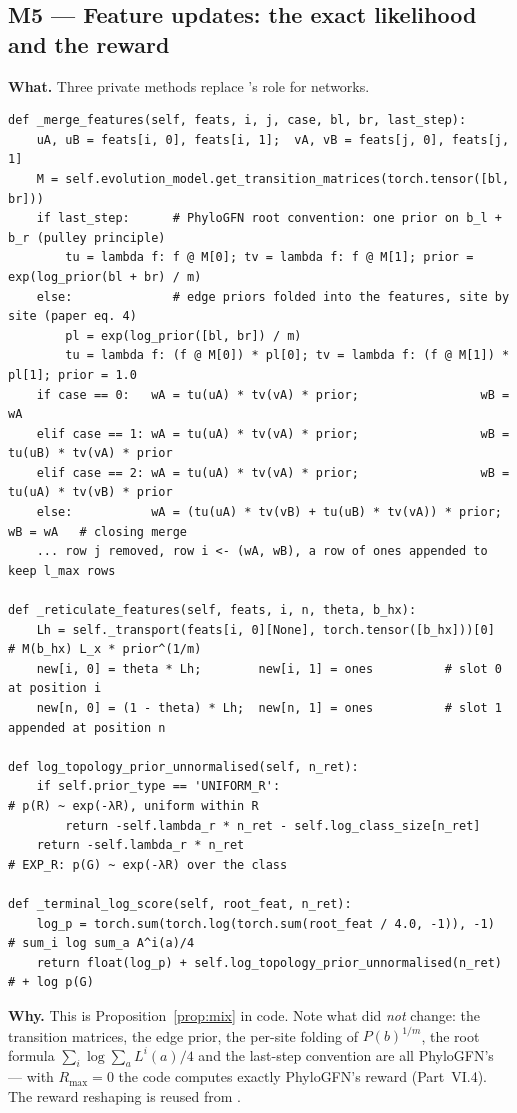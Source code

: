 \subsection{M5 --- Feature updates: the exact likelihood and the reward}
\textbf{What.} Three private methods replace 's role for networks.
\begin{lstlisting}
def _merge_features(self, feats, i, j, case, bl, br, last_step):
    uA, uB = feats[i, 0], feats[i, 1];  vA, vB = feats[j, 0], feats[j, 1]
    M = self.evolution_model.get_transition_matrices(torch.tensor([bl, br]))
    if last_step:      # PhyloGFN root convention: one prior on b_l + b_r (pulley principle)
        tu = lambda f: f @ M[0]; tv = lambda f: f @ M[1]; prior = exp(log_prior(bl + br) / m)
    else:              # edge priors folded into the features, site by site (paper eq. 4)
        pl = exp(log_prior([bl, br]) / m)
        tu = lambda f: (f @ M[0]) * pl[0]; tv = lambda f: (f @ M[1]) * pl[1]; prior = 1.0
    if case == 0:   wA = tu(uA) * tv(vA) * prior;                 wB = wA
    elif case == 1: wA = tu(uA) * tv(vA) * prior;                 wB = tu(uB) * tv(vA) * prior
    elif case == 2: wA = tu(uA) * tv(vA) * prior;                 wB = tu(uA) * tv(vB) * prior
    else:           wA = (tu(uA) * tv(vB) + tu(uB) * tv(vA)) * prior;  wB = wA   # closing merge
    ... row j removed, row i <- (wA, wB), a row of ones appended to keep l_max rows

def _reticulate_features(self, feats, i, n, theta, b_hx):
    Lh = self._transport(feats[i, 0][None], torch.tensor([b_hx]))[0]   # M(b_hx) L_x * prior^(1/m)
    new[i, 0] = theta * Lh;        new[i, 1] = ones          # slot 0 at position i
    new[n, 0] = (1 - theta) * Lh;  new[n, 1] = ones          # slot 1 appended at position n

def log_topology_prior_unnormalised(self, n_ret):
    if self.prior_type == 'UNIFORM_R':                                   # p(R) ~ exp(-λR), uniform within R
        return -self.lambda_r * n_ret - self.log_class_size[n_ret]
    return -self.lambda_r * n_ret                                        # EXP_R: p(G) ~ exp(-λR) over the class

def _terminal_log_score(self, root_feat, n_ret):
    log_p = torch.sum(torch.log(torch.sum(root_feat / 4.0, -1)), -1)   # sum_i log sum_a A^i(a)/4
    return float(log_p) + self.log_topology_prior_unnormalised(n_ret)   # + log p(G)
\end{lstlisting}
\textbf{Why.} This is Proposition~\ref{prop:mix} in code. Note what did \emph{not} change: the transition matrices, the edge prior, the per-site folding of $P(b)^{1/m}$, the root formula $\sum_i\log\sum_a L^i(a)/4$ and the last-step convention are all PhyloGFN's --- with $R_{\max}=0$ the code computes exactly PhyloGFN's reward (Part~VI.4). The reward reshaping  is reused from .

